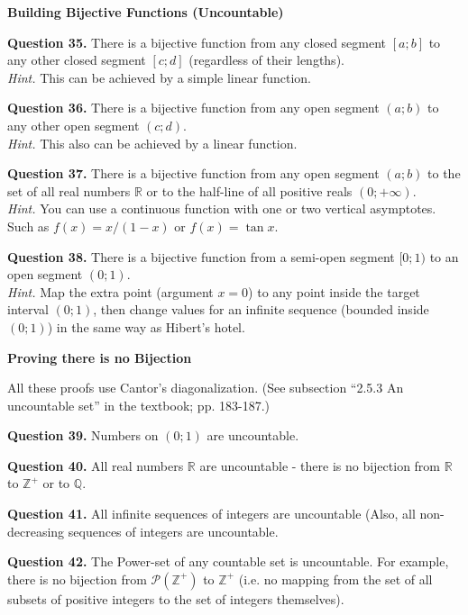 \documentclass[jou]{apa6}
\begin{document}
\vspace{20pt}
{\bf Building Bijective Functions (Uncountable)}

\vspace{6pt}
{\bf Question 35.}
There is a bijective function from any closed 
segment $[a;b]$ to any other closed segment $[c;d]$
(regardless of their lengths).\\
{\em Hint.} This can be achieved by a simple linear function.

\vspace{6pt}
{\bf Question 36.}
There is a bijective function from any open 
segment $(a;b)$ to any other open segment $(c;d)$.\\
{\em Hint.} This also can be achieved by a linear function. 

\vspace{6pt}
{\bf Question 37.}
There is a bijective function from any open 
segment $(a;b)$ to the set of all real numbers $\mathbb{R}$
or to the half-line of all positive reals $(0;+\infty)$.\\
{\em Hint.} You can use a continuous function with one or two 
vertical asymptotes. Such as $f(x) = x/(1-x)$ or $f(x) = \tan x$.

\vspace{6pt}
{\bf Question 38.}
There is a bijective function from a 
semi-open segment $[0;1)$ to an open segment $(0;1)$.\\
{\em Hint.} Map the extra point (argument $x = 0$) to any 
point inside the target interval $(0;1)$, then 
change values for an infinite sequence (bounded inside $(0;1)$)
in the same way as Hibert's hotel. 


\vspace{20pt}
{\bf Proving there is no Bijection}

All these proofs use Cantor's diagonalization. (See subsection 
``2.5.3 An uncountable set'' in the textbook; pp. 183-187.)

\vspace{6pt}
{\bf Question 39.} Numbers on $(0;1)$ are uncountable.


\vspace{6pt}
{\bf Question 40.}
 All real numbers $\mathbb{R}$ are uncountable - there 
is no bijection from $\mathbb{R}$ to $\mathbb{Z}^{+}$ or
to $\mathbb{Q}$. 


\vspace{6pt}
{\bf Question 41.} All infinite sequences of integers are uncountable
(Also, all non-decreasing sequences of integers are uncountable.


\vspace{6pt}
{\bf Question 42.} The Power-set of any countable set is 
uncountable. For example, 
there is no bijection from $\mathcal{P}(\mathbb{Z}^{+})$
to $\mathbb{Z}^{+}$ (i.e. no mapping from the set of all subsets of 
positive integers to the set of integers themselves).
\end{document}
